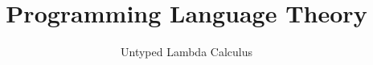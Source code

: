 \title{Programming Language Theory}
\subtitle{Untyped Lambda Calculus}


{
\begin{frame}\maketitle\end{frame}}

